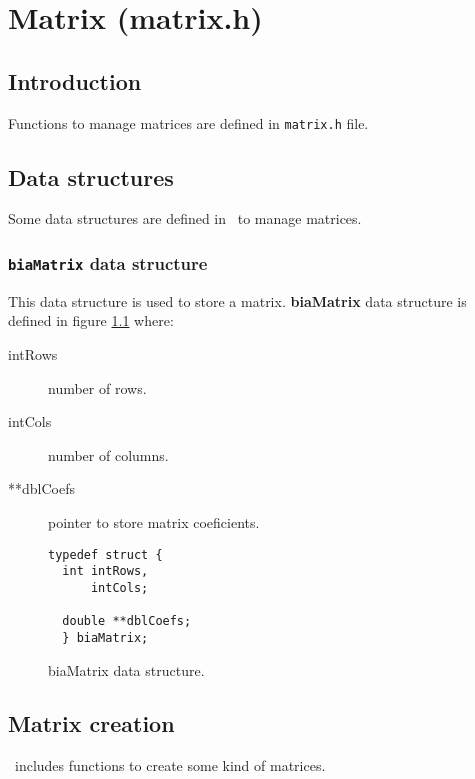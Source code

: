 %
%

\chapter{Matrix (matrix.h)}

\section{Introduction}

Functions to manage matrices are defined in \texttt{matrix.h} file.\\

\section{Data structures}

Some data structures are defined in \BI \ to manage matrices.

\subsection{\texttt{biaMatrix} data structure} \label{sec:biaMatrix}

This data structure is used to store a matrix. \textbf{biaMatrix} data structure is defined in figure \ref{fig:biaMatrix} where:

\begin{description}
\item[intRows] number of rows.
\item[intCols] number of columns.
\item[**dblCoefs] pointer to store matrix coeficients.
\end{description}

\begin{figure}[!h]
\begin{verbatim}
typedef struct {
  int intRows,
      intCols;

  double **dblCoefs;
  } biaMatrix;   
\end{verbatim}
\caption{biaMatrix data structure.} \label{fig:biaMatrix}
\end{figure}

\FloatBarrier

\section{Matrix creation}

\BI \ includes functions to create some kind of matrices.

